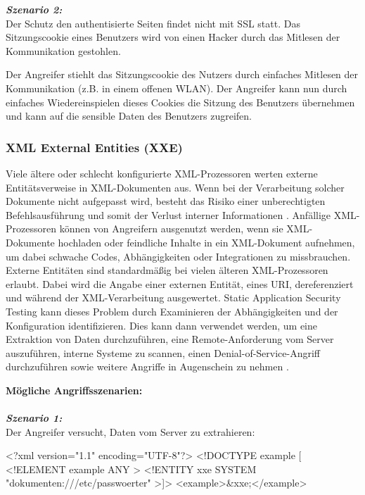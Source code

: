 \textbf{\textit{Szenario 2:}}\\

Der Schutz den authentisierte Seiten findet nicht mit SSL statt. Das Sitzungscookie eines Benutzers wird von einen Hacker durch das Mitlesen der Kommunikation gestohlen. 

Der Angreifer stiehlt das Sitzungscookie des Nutzers durch einfaches Mitlesen der Kommunikation (z.B. in einem offenen WLAN). Der Angreifer kann nun durch einfaches Wiedereinspielen dieses Cookies die Sitzung des Benutzers übernehmen und kann auf die sensible Daten des Benutzers zugreifen\cite{owasp13top10}.

\subsubsection{XML External Entities (XXE)}

Viele ältere oder schlecht konfigurierte XML-Prozessoren werten externe Entitätsverweise in XML-Dokumenten aus. Wenn bei der Verarbeitung solcher Dokumente nicht aufgepasst wird, besteht das Risiko einer unberechtigten Befehlsausführung und somit der Verlust interner Informationen \cite[6]{owasp17top10}. Anfällige XML-Prozessoren können von Angreifern ausgenutzt werden, wenn sie XML-Dokumente hochladen oder feindliche Inhalte in ein XML-Dokument aufnehmen, um dabei schwache Codes, Abhängigkeiten oder Integrationen zu missbrauchen. Externe Entitäten sind standardmäßig bei vielen älteren XML-Prozessoren erlaubt. Dabei wird die Angabe einer externen Entität, eines URI, dereferenziert und während der XML-Verarbeitung ausgewertet. Static Application Security Testing kann dieses Problem durch Examinieren der Abhängigkeiten und der Konfiguration identifizieren. Dies kann dann verwendet werden, um eine Extraktion von Daten durchzuführen, eine Remote-Anforderung vom Server auszuführen, interne Systeme zu scannen, einen Denial-of-Service-Angriff durchzuführen sowie weitere Angriffe in Augenschein zu nehmen \cite[10]{owasp17top10}.

\textbf{Mögliche Angriffsszenarien:}\\
\\
\textbf{\textit{Szenario 1:}}\\
Der Angreifer versucht, Daten vom Server zu extrahieren\cite[10]{owasp17top10}:\\

\begin{LaTeXCode}[caption={XML-Beispiel},captionpos=b, label=LaTeXCode:xxe1][numbers=none]
<?xml version="1.1" encoding="UTF-8"?>
<!DOCTYPE example [
<!ELEMENT example ANY >
<!ENTITY xxe SYSTEM "dokumenten:///etc/passwoerter" >]>
<example>\&xxe;</example>
\end{LaTeXCode}

